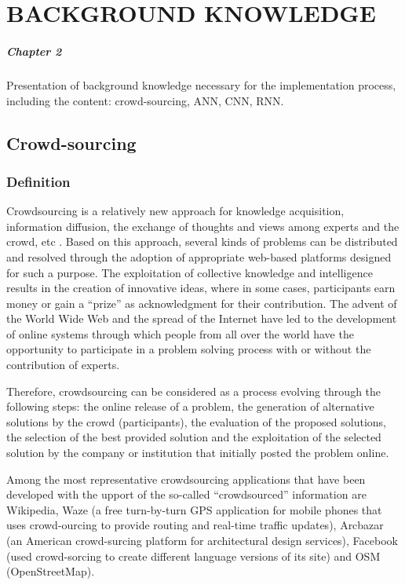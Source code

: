 \chapter{BACKGROUND KNOWLEDGE}
\label{chap:background}

\paragraph{Chapter 2} Presentation of background knowledge necessary for the implementation process, including the content: crowd-sourcing, ANN, CNN, RNN.

\section{Crowd-sourcing}
\subsection{Definition}
Crowdsourcing is a relatively new approach for knowledge acquisition, information diffusion, the exchange of thoughts and views among experts and the crowd, etc \cite{futureinternet0600109}. Based on this approach, several kinds of problems can be distributed and resolved through the adoption of appropriate web-based platforms designed for such a purpose. The exploitation of collective knowledge and intelligence results in the creation of innovative ideas, where in some cases, participants earn money or gain a “prize” as acknowledgment for their contribution. The advent of the World Wide Web and the spread of the Internet have led to the development of online systems through which people from all over the world have the opportunity to participate in a problem solving process with or without the contribution of experts. 

Therefore, crowdsourcing can be considered as a process evolving through the following steps: the online release of a problem, the generation of alternative solutions by the crowd (participants), the evaluation of the proposed solutions, the selection of the best provided solution and the exploitation of the selected solution by the company or institution that initially posted the problem online.

 Among the most representative crowdsourcing applications that have been developed with the upport of the so-called “crowdsourced” information are Wikipedia, Waze (a free turn-by-turn GPS application for mobile phones that uses crowd-ourcing to provide routing and real-time traffic updates), Arcbazar (an American crowd-surcing platform for architectural design services), Facebook (used crowd-sorcing to create different language versions of its site) and OSM (OpenStreetMap).
 
